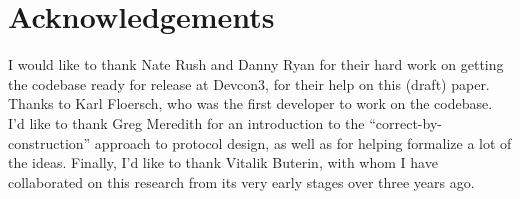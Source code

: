 \documentclass{article}
\theoremstyle{definition}
\begin{document}
\section{Acknowledgements}

I would like to thank Nate Rush and Danny Ryan for their hard work on getting the codebase ready for release at Devcon3, for their help on this (draft) paper. Thanks to Karl Floersch, who was the first developer to work on the codebase. I'd like to thank Greg Meredith for an introduction to the ``correct-by-construction'' approach to protocol design, as well as for helping formalize a lot of the ideas. Finally, I'd like to thank Vitalik Buterin, with whom I have collaborated on this research from its very early stages over three years ago.



\end{document}
